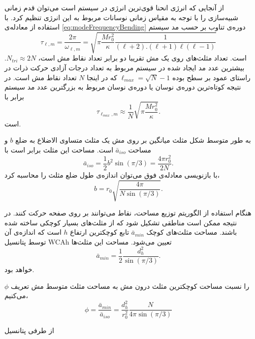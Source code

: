 از آنجایی که انرژی انحنا قوی‌ترین انرژی در سیستم است می‌توان قدم زمانی شبیه‌سازی را با توجه به مقیاس زمانی نوسانات مربوط به این انرژی تنظیم کرد. با استفاده از معادله‌ی 
\ref{eq:modeFrequencyBending}
دوره‌ی تناوب بر حسب مد سیستم
\begin{equation}
\tau_{\ell,m}=\frac{2\pi}{\omega_{\ell,m}}=\sqrt{\pi \frac{Mr_0^2}{\kappa}\frac{1}{(\ell+2).(\ell+1)\ell(\ell-1)}}
\label{eq:Lperiod}
\end{equation}
است. تعداد مثلث‌های روی یک مش تقریبا دو برابر تعداد نقاط مش است،
$N_{tri}\approx 2N$.
بیشترین عدد مد ایجاد شده در سیستم مربوط به تعداد درجات آزادی حرکت ذرات در راستای عمود بر سطح بوده
$\ell_{max}=\sqrt{N}-1$ 
\cite{Gompper1996}
که در اینجا 
$N$
تعداد نقاط مش است. در نتیجه کوتاه‌ترین دوره‌ی نوسان یا دوره‌ی نوسان مربوط به بزرگترین عدد مد سیستم برابر با 
\begin{equation}
\tau_{\ell_{max},m}\approx \frac{1}{N}\sqrt{\pi \frac{Mr_0^2}{\kappa}}.
\label{eq:LmaxPeriod}
\end{equation}
است. 

به طور متوسط شکل مثلث میانگین بر روی مش یک مثلث متساوی الاضلاع به ضلع
$b$
و مساحت 
 $\bar a_{iso}$
 است. مساحت این مثلث برابر است با
 \begin{equation}
\bar a_{iso}=\frac{1}{2}b^2\sin(\pi/3)=\frac{4\pi r_0^2}{2N}.
\label{eq:averageTriArea}
\end{equation}
 با بازنویسی معادله‌ی فوق می‌توان اندازه‌ی طول ضلع مثلث را محاسبه کرد،
 \begin{equation}
b=r_0\sqrt{\frac{4\pi}{N\sin(\pi/3)}}.
\label{eq:averageTriArea}
\end{equation}
 
هنگام استفاده از الگوریتم توزیع مساحت، نقاط می‌توانند بر روی صفحه حرکت کنند. در نتیجه ممکن است مناطقی تشکیل شود که از مثلث‌های بسیار کوچکی ساخته شده باشند. مساحت مثلث‌های کوچک
$\bar a_{min}$
تابع کوچکترین ارتفاع 
$h$
است که اندازه‌ی آن توسط پتانسیل
WCAh
تعیین می‌شود. مساحت این مثلث‌ها 
\begin{equation}
\bar a_{min}=\frac{1}{2}\frac{d_h^2}{\sin(\pi/3)}.
\label{eq:aMin}
\end{equation}
خواهد بود.


$\phi$
را نسبت مساحت کوچکترین مثلث درون مش به مساحت مثلث متوسط مش تعریف می‌کنیم،
\begin{equation}
\phi=\frac{\bar a_{min}}{\bar a_{iso}}=\frac{d_h^2}{r_0^2}\frac{N}{4\pi\sin(\pi/3)}
\label{eq:phiDef}
\end{equation}

از طرفی پتانسیل 


